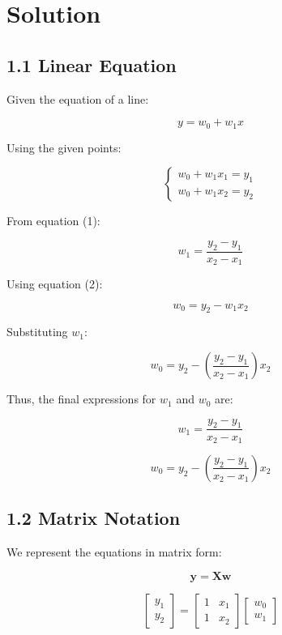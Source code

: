 \documentclass{../harvardml}
\theoremstyle{definition}
\theoremstyle{plain}
\newenvironment{solution}
  {\color{blue}\section*{Solution}}
{}
\begin{document}
\begin{solution}


    \subsection*{1.1 Linear Equation}
    Given the equation of a line:
    
    \begin{equation}
        y = w_0 + w_1 x
    \end{equation}
    
    Using the given points:
    
    \[
    \begin{cases}
        w_0 + w_1 x_1 = y_1 \\
        w_0 + w_1 x_2 = y_2
    \end{cases}
    \]
    
    From equation (1):
    
    \begin{equation}
        w_1 = \frac{y_2 - y_1}{x_2 - x_1}
    \end{equation}
    
    Using equation (2):
    
    \begin{equation}
        w_0 = y_2 - w_1 x_2
    \end{equation}
    
    Substituting $w_1$:
    
    \begin{equation}
        w_0 = y_2 - \left(\frac{y_2 - y_1}{x_2 - x_1} \right) x_2
    \end{equation}
    
    Thus, the final expressions for $w_1$ and $w_0$ are:
    
    \[
    w_1 = \frac{y_2 - y_1}{x_2 - x_1}
    \]
    
    \[
    w_0 = y_2 - \left(\frac{y_2 - y_1}{x_2 - x_1} \right) x_2
    \]
    
    \subsection*{1.2 Matrix Notation}
    
    We represent the equations in matrix form:
    
    \[
    \bm{y} = \bm{X} \bm{w}
    \]
    
    \[
    \begin{bmatrix}
        y_1 \\
        y_2
    \end{bmatrix}
    =
    \begin{bmatrix}
        1 & x_1 \\
        1 & x_2
    \end{bmatrix}
    \begin{bmatrix}
        w_0 \\
        w_1
    \end{bmatrix}
    \]
    

\end{solution}
\end{document}
